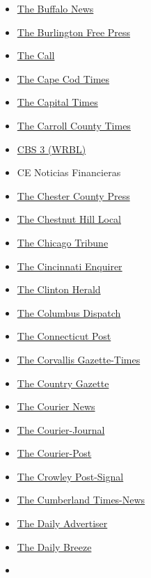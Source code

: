\begin{itemize}
{  Courier Times}
\item
  \href{https://buffalonews.com/}{The Buffalo News}
\item
  \href{https://www.burlingtonfreepress.com/}{The Burlington Free Press}
\item
  \href{https://www.woonsocketcall.com/}{The Call}
\item
  \href{https://www.capecodtimes.com/}{The Cape Cod Times}
\item
  \href{https://madison.com/ct/}{The Capital Times}
\item
  \href{https://www.baltimoresun.com/maryland/carroll/}{The Carroll
  County Times}
\item
  \href{https://www.wrbl.com/}{CBS 3 (WRBL)}
\item
  CE Noticias Financieras
\item
  \href{http://www.chestercounty.com/}{The Chester County Press}
\item
  \href{https://www.chestnuthilllocal.com/}{The Chestnut Hill Local}
\item
  \href{https://www.chicagotribune.com/}{The Chicago Tribune}
\item
  \href{https://www.cincinnati.com/}{The Cincinnati Enquirer}
\item
  \href{https://www.clintonherald.com/}{The Clinton Herald}
\item
  \href{https://www.dispatch.com/}{The Columbus Dispatch}
\item
  \href{https://www.ctpost.com/}{The Connecticut Post}
\item
  \href{https://www.gazettetimes.com/}{The Corvallis Gazette-Times}
\item
  \href{https://bellingham.wickedlocal.com/}{The Country Gazette}
\item
  \href{https://www.mycentraljersey.com/}{The Courier News}
\item
  \href{https://www.courier-journal.com/}{The Courier-Journal}
\item
  \href{https://www.courierpostonline.com/}{The Courier-Post}
\item
  \href{https://www.crowleypostsignal.com/}{The Crowley Post-Signal}
\item
  \href{https://www.times-news.com/}{The Cumberland Times-News}
\item
  \href{https://www.theadvertiser.com/}{The Daily Advertiser}
\item
  \href{https://www.dailybreeze.com/}{The Daily Breeze}
\item

\end{itemize}
